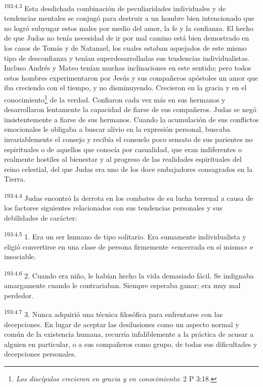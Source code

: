 \par
\textsuperscript{193:4.3} Esta desdichada combinación de peculiaridades individuales y de tendencias mentales se conjugó para destruir a un hombre bien intencionado que no logró subyugar estos males por medio del amor, la fe y la confianza. El hecho de que Judas no tenía necesidad de ir por mal camino está bien demostrado en los casos de Tomás y de Natanael, los cuales estaban aquejados de este mismo tipo de desconfianza y tenían superdesarrolladas sus tendencias individualistas. Incluso Andrés y Mateo tenían muchas inclinaciones en este sentido; pero todos estos hombres experimentaron por Jesús y sus compañeros apóstoles un amor que iba creciendo con el tiempo, y no disminuyendo. Crecieron en la gracia y en el conocimiento\footnote{\textit{Los discípulos crecieron en gracia y en conocimiento}: 2 P 3:18.} de la verdad. Confiaron cada vez más en sus hermanos y desarrollaron lentamente la capacidad de fiarse de sus compañeros. Judas se negó insistentemente a fiarse de sus hermanos. Cuando la acumulación de sus conflictos emocionales le obligaba a buscar alivio en la expresión personal, buscaba invariablemente el consejo y recibía el consuelo poco sensato de sus parientes no espirituales o de aquellos que conocía por casualidad, que eran indiferentes o realmente hostiles al bienestar y al progreso de las realidades espirituales del reino celestial, del que Judas era uno de los doce embajadores consagrados en la Tierra.

\par
\textsuperscript{193:4.4} Judas encontró la derrota en los combates de su lucha terrenal a causa de los factores siguientes relacionados con sus tendencias personales y sus debilidades de carácter:

\par
\textsuperscript{193:4.5} 1. Era un ser humano de tipo solitario. Era sumamente individualista y eligió convertirse en una clase de persona firmemente «encerrada en sí misma» e insociable.

\par
\textsuperscript{193:4.6} 2. Cuando era niño, le habían hecho la vida demasiado fácil. Se indignaba amargamente cuando le contrariaban. Siempre esperaba ganar; era muy mal perdedor.

\par
\textsuperscript{193:4.7} 3. Nunca adquirió una técnica filosófica para enfrentarse con las decepciones. En lugar de aceptar las desilusiones como un aspecto normal y común de la existencia humana, recurría infaliblemente a la práctica de acusar a alguien en particular, o a sus compañeros como grupo, de todas sus dificultades y decepciones personales.

